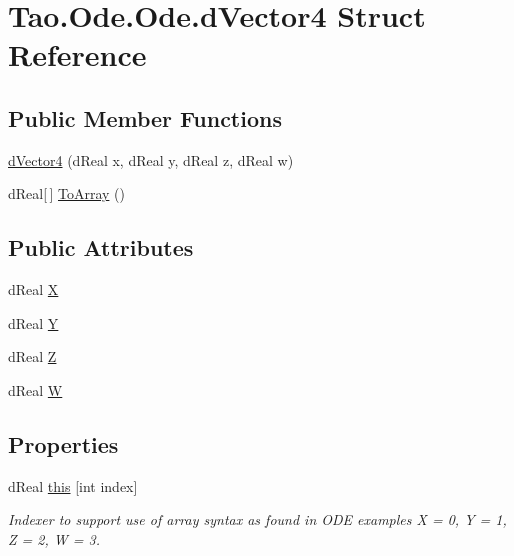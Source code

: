 \hypertarget{struct_tao_1_1_ode_1_1_ode_1_1d_vector4}{
\section{Tao.Ode.Ode.dVector4 Struct Reference}
\label{struct_tao_1_1_ode_1_1_ode_1_1d_vector4}
}
\subsection*{Public Member Functions}
\begin{DoxyCompactItemize}
\item 
\hyperlink{struct_tao_1_1_ode_1_1_ode_1_1d_vector4_ac82beaad93e5e2650da3b9b967c7da98}{dVector4} (dReal x, dReal y, dReal z, dReal w)
\item 
dReal\mbox{[}$\,$\mbox{]} \hyperlink{struct_tao_1_1_ode_1_1_ode_1_1d_vector4_aeab12f2b46a5f97444e96ae432fe5333}{ToArray} ()
\end{DoxyCompactItemize}
\subsection*{Public Attributes}
\begin{DoxyCompactItemize}
\item 
dReal \hyperlink{struct_tao_1_1_ode_1_1_ode_1_1d_vector4_aaf49131f71e1646a0daead1f177e31e3}{X}
\item 
dReal \hyperlink{struct_tao_1_1_ode_1_1_ode_1_1d_vector4_acb788d66c1d18be2e7d912729c9ebfd9}{Y}
\item 
dReal \hyperlink{struct_tao_1_1_ode_1_1_ode_1_1d_vector4_af591a8cc6be6f3b2d15a304e99285b12}{Z}
\item 
dReal \hyperlink{struct_tao_1_1_ode_1_1_ode_1_1d_vector4_a473e7cd9bea8d218b3974ab6435f60e7}{W}
\end{DoxyCompactItemize}
\subsection*{Properties}
\begin{DoxyCompactItemize}
\item 
dReal \hyperlink{struct_tao_1_1_ode_1_1_ode_1_1d_vector4_a7d9b55ac2b24b6f5c23738cd8dc85a7d}{this} \mbox{[}int index\mbox{]}
\begin{DoxyCompactList}\small\item\em Indexer to support use of array syntax as found in ODE examples X = 0, Y = 1, Z = 2, W = 3. \item\end{DoxyCompactList}\end{DoxyCompactItemize}


